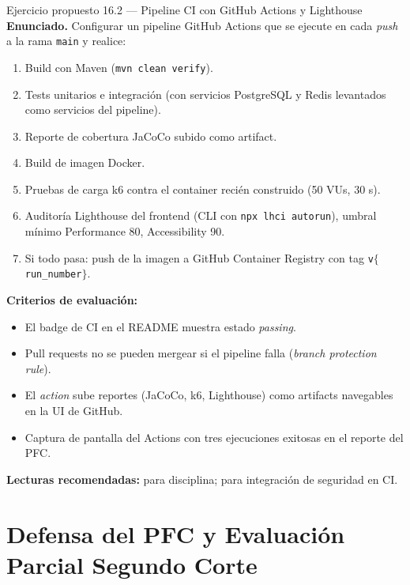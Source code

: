 \documentclass[11pt,a4paper,openany]{book}
\begin{document}
\begin{cajaejercicio}{Ejercicio propuesto 16.2 --- Pipeline CI con GitHub Actions y Lighthouse}
\textbf{Enunciado.} Configurar un pipeline GitHub Actions que se
ejecute en cada \emph{push} a la rama \texttt{main} y realice:
\begin{enumerate}
\item Build con Maven (\texttt{mvn clean verify}).
\item Tests unitarios e integración (con servicios PostgreSQL y
Redis levantados como servicios del pipeline).
\item Reporte de cobertura JaCoCo subido como artifact.
\item Build de imagen Docker.
\item Pruebas de carga k6 contra el container recién construido
(50 VUs, 30 s).
\item Auditoría Lighthouse del frontend (CLI con \texttt{npx lhci
autorun}), umbral mínimo Performance 80, Accessibility 90.
\item Si todo pasa: push de la imagen a GitHub Container Registry
con tag \texttt{v$\{$run\_number$\}$}.
\end{enumerate}

\textbf{Criterios de evaluación:}
\begin{itemize}
\item El badge de CI en el README muestra estado \emph{passing}.
\item Pull requests no se pueden mergear si el pipeline falla
(\emph{branch protection rule}).
\item El \emph{action} sube reportes (JaCoCo, k6, Lighthouse) como
artifacts navegables en la UI de GitHub.
\item Captura de pantalla del Actions con tres ejecuciones exitosas
en el reporte del PFC.
\end{itemize}

\textbf{Lecturas recomendadas:} \cite{martin2017clean} para
disciplina; \cite{ortega2022securecoding} para integración de
seguridad en CI.
\end{cajaejercicio}

\chapter{Defensa del PFC y Evaluación Parcial Segundo Corte}
\label{cap:semana17}
\end{document}
